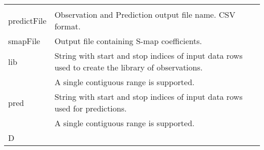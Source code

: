 \documentclass[]{article}
\begin{document}
\begin{longtable}[]{@{}ll@{}}
\begin{minipage}[t]{0.85\columnwidth}
\end{minipage}\tabularnewline
\begin{minipage}[t]{0.09\columnwidth}\raggedright
predictFile\strut
\end{minipage} & \begin{minipage}[t]{0.85\columnwidth}\raggedright
Observation and Prediction output file name. CSV format.\strut
\end{minipage}\tabularnewline
\begin{minipage}[t]{0.09\columnwidth}\raggedright
smapFile\strut
\end{minipage} & \begin{minipage}[t]{0.85\columnwidth}\raggedright
Output file containing S-map coefficients.\strut
\end{minipage}\tabularnewline
\begin{minipage}[t]{0.09\columnwidth}\raggedright
lib\strut
\end{minipage} & \begin{minipage}[t]{0.85\columnwidth}\raggedright
String with start and stop indices of input data rows used to create the
library of observations.\strut
\end{minipage}\tabularnewline
\begin{minipage}[t]{0.09\columnwidth}\raggedright
\strut
\end{minipage} & \begin{minipage}[t]{0.85\columnwidth}\raggedright
A single contiguous range is supported.\strut
\end{minipage}\tabularnewline
\begin{minipage}[t]{0.09\columnwidth}\raggedright
pred\strut
\end{minipage} & \begin{minipage}[t]{0.85\columnwidth}\raggedright
String with start and stop indices of input data rows used for
predictions.\strut
\end{minipage}\tabularnewline
\begin{minipage}[t]{0.09\columnwidth}\raggedright
\strut
\end{minipage} & \begin{minipage}[t]{0.85\columnwidth}\raggedright
A single contiguous range is supported.\strut
\end{minipage}\tabularnewline
\begin{minipage}[t]{0.09\columnwidth}\raggedright
D\strut
\end{minipage} & \begin{minipage}[t]{0.85\columnwidth}\raggedright

\end{minipage}
\end{longtable}
\end{document}
